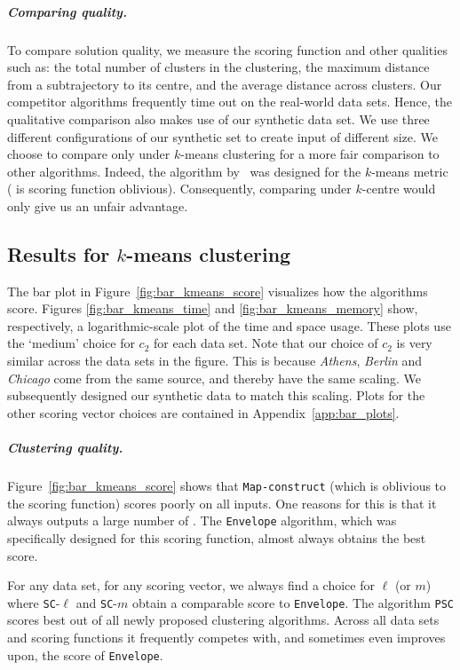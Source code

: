 \documentclass[english, thm-restate]{lipics-v2021}
\begin{document}
\subparagraph{Comparing quality.}
To compare solution quality, we measure the scoring function and other qualities such as: the total number of clusters in the clustering, the maximum \frechet distance from a subtrajectory to its centre, and the average \frechet distance across clusters. Our competitor algorithms frequently time out on the real-world data sets.
Hence, the qualitative comparison also makes use of our synthetic data set. We use three different configurations of our synthetic set to create input of different size. We choose to compare only under $k$-means clustering for a more fair comparison to other algorithms. Indeed, the algorithm by~\cite{agarwal2018subtrajectory} was designed for the $k$-means metric (\cite{buchin2020improved} is scoring function oblivious). 
Consequently, comparing under $k$-centre would only give us an unfair advantage.


\subsection{Results for $k$-means clustering}
The bar plot in Figure~\ref{fig:bar_kmeans_score} visualizes how the algorithms score. 
Figures \ref{fig:bar_kmeans_time} and \ref{fig:bar_kmeans_memory} show, respectively, a logarithmic-scale plot of the time and space usage. 
These plots use the `medium' choice for $c_2$ for each data set. 
Note that our choice of $c_2$ is very similar across the data sets in the figure.
This is because \emph{Athens}, \emph{Berlin} and \emph{Chicago} come from the same source, and thereby have the same scaling.
We subsequently designed our synthetic data to match this scaling.
Plots for the other scoring vector choices are contained in Appendix~\ref{app:bar_plots}. 

\subparagraph{Clustering quality.}
Figure~\ref{fig:bar_kmeans_score} shows that \texttt{Map-construct} (which is oblivious to the scoring function) scores poorly on all inputs.  One reasons for this is that it always outputs a large number of \pathlets.  
The \texttt{Envelope} algorithm, which was specifically designed for this scoring function, almost always obtains the best score. 

For any data set, for any scoring vector, we always find a choice for $\ell$ (or $m$) where \texttt{SC}-$\ell$ and \texttt{SC}-$m$ obtain a comparable score to \texttt{Envelope}.
The algorithm \texttt{PSC} scores best out of all newly proposed clustering algorithms.
Across all data sets and scoring functions it frequently competes with, and sometimes even improves upon, the score of \texttt{Envelope}. 
\end{document}
